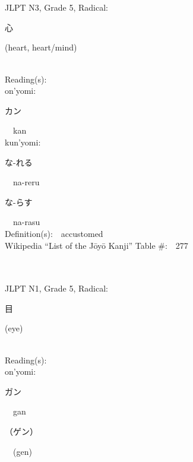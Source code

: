\begin{multicols}{2}
\ \ \\
{\fontsize{34pt}{40pt}  }\ \ \\  %
{JLPT N3, Grade 5, Radical:\ \ {\begin{CJK}{UTF8}{min} 心 \end{CJK}} (heart, heart/mind) } \\
Reading(s):\ \ \\
{\hspace*{1em}}on'yomi:\ \ \\
{\hspace*{2em}}{\begin{CJK}{UTF8}{min} カン \end{CJK}}\ \ kan\ \ \\
{\hspace*{1em}}kun'yomi:\ \ \\
{\hspace*{2em}}{\begin{CJK}{UTF8}{min} な-れる \end{CJK}}\ \ na-reru\ \ \\
{\hspace*{2em}}{\begin{CJK}{UTF8}{min} な-らす \end{CJK}}\ \ na-rasu\ \ \\
Definition(s):\ \ accustomed \\
Wikipedia ``List of the J\=oy\=o Kanji'' Table \#:\ \ 277 \\
\ \ \\
{\fontsize{34pt}{40pt}  }\ \ \\  %
{JLPT N1, Grade 5, Radical:\ \ {\begin{CJK}{UTF8}{min} 目 \end{CJK}} (eye) } \\
Reading(s):\ \ \\
{\hspace*{1em}}on'yomi:\ \ \\
{\hspace*{2em}}{\begin{CJK}{UTF8}{min} ガン \end{CJK}}\ \ gan\ \ \\
{\hspace*{2em}}{\begin{CJK}{UTF8}{min} （ゲン） \end{CJK}}\ \ (gen)\ \ \\

\end{multicols}
